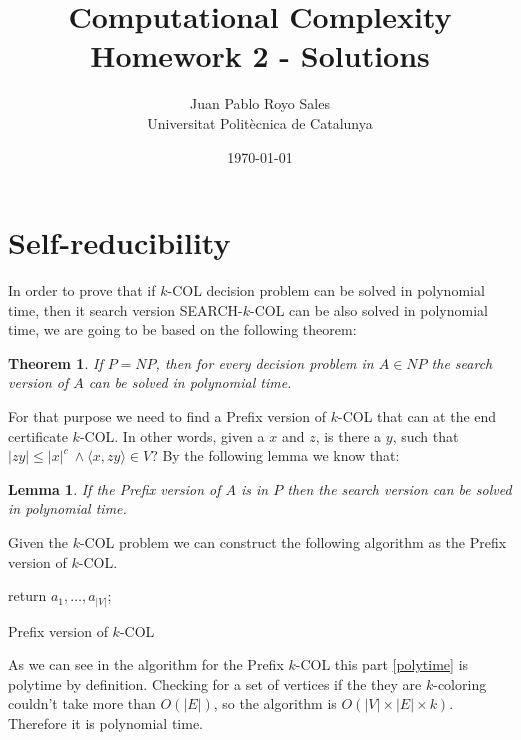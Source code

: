 \documentclass[12pt, a4paper]{article}
\title{%
  Computational Complexity \\
  Homework 2 - Solutions
}
\author{%
  Juan Pablo Royo Sales\\
  \small{Universitat Politècnica de Catalunya}
}
\date\today
\begin{document}
\maketitle

\section{Self-reducibility}

In order to prove that if $k$-COL decision problem can be solved in polynomial time, then it search version SEARCH-$k$-COL can be also solved in polynomial time, we are going to be based on the following theorem:

\newtheorem{searchpnp}{Theorem}
\begin{searchpnp}
  If $P = NP$, then for every decision problem in $A \in NP$ the search version of $A$ can be solved in polynomial time.
\end{searchpnp}

For that purpose we need to find a Prefix version of $k$-COL that can at the end certificate $k$-COL. In other words, given a $x$ and $z$, is there a $y$, such that $|zy| \leq |x|^c\ \land \langle x,zy \rangle \in V$?
By the following lemma we know that:

\newtheorem{lemmasearch}{Lemma}
\begin{lemmasearch}
  If the Prefix version of $A$ is in $P$ then the search version can be solved in polynomial time.
\end{lemmasearch}

Given the $k$-COL problem we can construct the following algorithm as the Prefix version of $k$-COL.

\begin{algorithm}[H]
  return $a_1,\dots,a_{|V|}$;
  \caption{Prefix version of $k$-COL}
\end{algorithm}

As we can see in the algorithm for the Prefix $k$-COL this part \ref{polytime} is polytime by definition. Checking for a set of vertices if the they are $k$-coloring couldn't take more than $O(|E|)$, so the algorithm is $O(|V| \times |E| \times k)$. Therefore it is polynomial time.
\end{document}
